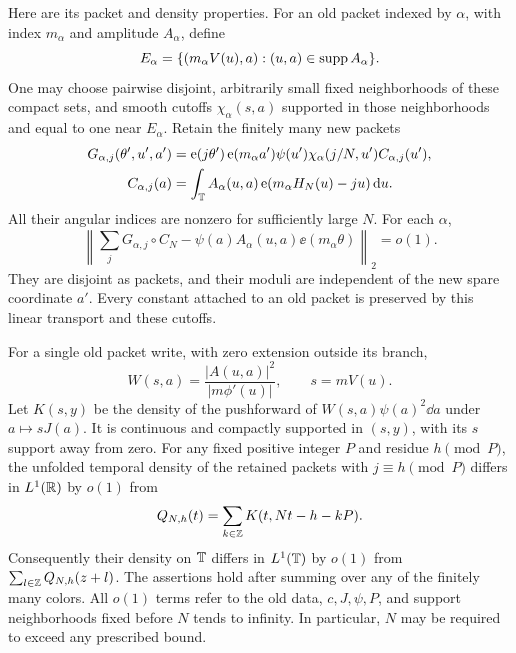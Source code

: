 \begin{lemma}[Passage]
Here are its packet and density properties. For an old packet indexed
by $\alpha$, with index $m_\alpha$ and amplitude $A_\alpha$, define
\begin{equation}\label{eq:stationary-image}
 E_\alpha=\{(m_\alpha V(u),a):(u,a)\in\operatorname{supp} A_\alpha\}.
\end{equation}
One may choose pairwise disjoint, arbitrarily small fixed neighborhoods
of these compact sets, and smooth cutoffs $\chi_\alpha(s,a)$ supported
in those neighborhoods and equal to one near $E_\alpha$. Retain the
finitely many new packets
\begin{align}
 G_{\alpha,j}(\theta',u',a')
   &=\operatorname{e}(j\theta')\operatorname{e}(m_\alpha a')
       \psi(u')\chi_\alpha(j/N,u')C_{\alpha,j}(u'),
       \label{eq:retained-packets}\\
 C_{\alpha,j}(a)
   &=\int_\mathbb T A_\alpha(u,a)\operatorname{e}(m_\alpha H_N(u)-ju)\,\mathrm d u.
       \label{eq:exact-passage-coefficient}
\end{align}
All their angular indices are nonzero for sufficiently large $N$.
For each $\alpha$,
\begin{equation}\label{eq:transport-norm}
 \left\|\sum_jG_{\alpha,j}\circ C_N
       -\psi(a)A_\alpha(u,a)\ee(m_\alpha\theta)\right\|_2=o(1).
\end{equation}
They are disjoint as packets, and their moduli are independent of the
new spare coordinate $a'$. Every constant attached to an old packet is
preserved by this linear transport and these cutoffs.

For a single old packet write, with zero extension outside its branch,
\begin{equation}\label{eq:W-definition}
 W(s,a)=\frac{|A(u,a)|^2}{|m\phi'(u)|},\qquad s=mV(u).
\end{equation}
Let $K(s,y)$ be the density of the pushforward of
$W(s,a)\psi(a)^2\dd a$ under $a\mapsto sJ(a)$. It is continuous and
compactly supported in $(s,y)$, with its $s$ support away from zero.
For any fixed positive integer $P$ and residue $h\pmod P$, the unfolded
temporal density of the retained packets with $j\equiv h\pmod P$ differs
in $L^1(\mathbb R)$ by $o(1)$ from
\begin{equation}\label{eq:fine-density-unfolded}
 Q_{N,h}(t)=\sum_{k\in\mathbb Z}K(t,Nt-h-kP).
\end{equation}
Consequently their density on $\mathbb T$ differs in $L^1(\mathbb T)$ by $o(1)$ from
$\sum_{l\in\mathbb Z}Q_{N,h}(z+l)$. The assertions hold after summing over
any of the finitely many colors. All $o(1)$ terms refer to the old data,
$c,J,\psi,P$, and support neighborhoods fixed before $N$ tends to
infinity. In particular, $N$ may be required to exceed any prescribed
bound.
\end{lemma}

